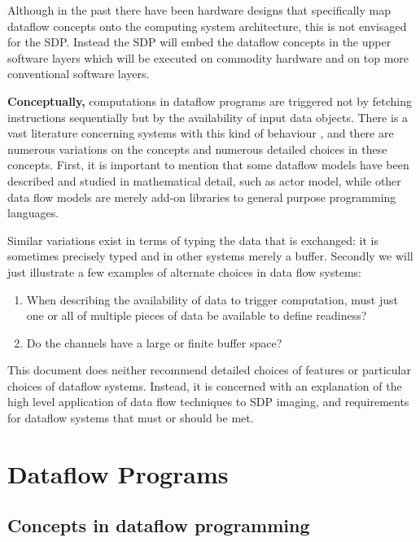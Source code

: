 \documentclass[11pt,a4paper]{article}
\begin{document}
Although in the past there have been hardware designs that
specifically map dataflow concepts onto the computing system
architecture, this is not envisaged for the SDP. Instead the SDP will
embed the dataflow concepts in the upper software layers which will be
executed on commodity hardware and on top more conventional software
layers.

{\bf Conceptually,} computations in dataflow programs are triggered
not by fetching instructions sequentially but by the availability of
input data objects.  There is a vast literature concerning systems
with this kind of behaviour \citep[see the review
by][]{Johnston:2004:ADP:1013208.1013209}, and there are numerous
variations on the concepts and numerous detailed choices in these
concepts.  First, it is important to mention that some dataflow models
have been described and studied in mathematical detail, such as
\cite{Hewitt:1973:UMA:1624775.1624804} actor model, while other data
flow models are merely add-on libraries to general purpose programming
languages.

Similar variations exist in terms of typing the data that is
exchanged: it is sometimes precisely typed and in other systems merely
a buffer. Secondly we will just illustrate a few examples of alternate
choices in data flow systems:
\begin{enumerate}
  \item When describing the availability of data
  to trigger computation, must just one or all of multiple pieces of
  data be available to define readiness?  
\item Do the channels have a large or finite buffer space?
\end{enumerate}
This document does neither recommend detailed choices of features or
particular choices of dataflow systems.  Instead, it is concerned with
an explanation of the high level application of data flow techniques
to SDP imaging, and requirements for dataflow systems that must or
should be met.

\section{Dataflow Programs}

\subsection{Concepts in dataflow programming}
\end{document}
